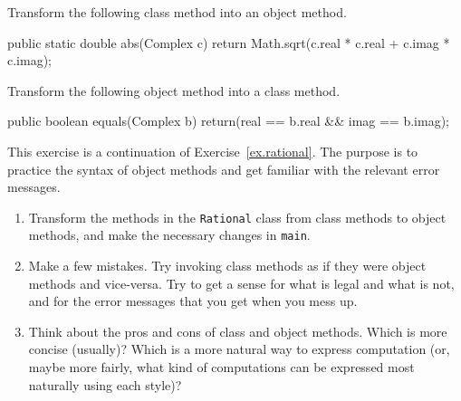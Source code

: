 \begin{exercise}

Transform the following class method into an object method.

\begin{code}
public static double abs(Complex c) {
    return Math.sqrt(c.real * c.real + c.imag * c.imag);
}
\end{code}
\end{exercise}


\begin{exercise}
Transform the following object method into a class method.

\begin{code}
public boolean equals(Complex b) {
    return(real == b.real && imag == b.imag);
}
\end{code}
\end{exercise}


\begin{exercise}

This exercise is a continuation of Exercise~\ref{ex.rational}.
The purpose is to practice the syntax of object methods and
get familiar with the relevant error messages.

\begin{enumerate}

\item Transform the methods in the {\tt Rational} class
from class methods to object methods, and make the necessary
changes in {\tt main}.

\item Make a few mistakes.  Try invoking class methods as if
they were object methods and vice-versa.  Try to get a sense for
what is legal and what is not, and for the error messages that
you get when you mess up.

\item Think about the pros and cons of
class and object methods.  Which is more concise (usually)?
Which is a more natural way to express computation (or, maybe
more fairly, what kind of computations can be expressed most
naturally using each style)?

\end{enumerate}
\end{exercise}


